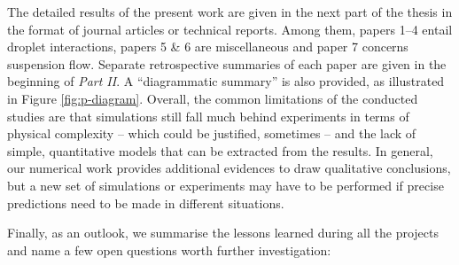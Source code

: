 The detailed results of the present work are given in the next part of the thesis in the format of journal articles or technical reports.
Among them, 
papers 1--4 entail droplet interactions,
papers 5 \& 6 are miscellaneous and
paper 7 concerns suspension flow.
Separate retrospective summaries of each paper are given in the beginning of \emph{Part II}.
A ``diagrammatic summary'' is also provided, as illustrated in Figure \ref{fig:p-diagram}.
Overall, the common limitations of the conducted studies are that simulations still fall much behind experiments in terms of physical complexity
-- which could be justified, sometimes --
and the lack of simple, quantitative models that can be extracted from the results.
In general, our numerical work provides additional evidences to draw qualitative conclusions,
but a new set of simulations or experiments may have to be performed if precise predictions need to be made in different situations.

Finally, as an outlook, we summarise the lessons learned during all the projects and name a few open questions worth further investigation:
\medskip

